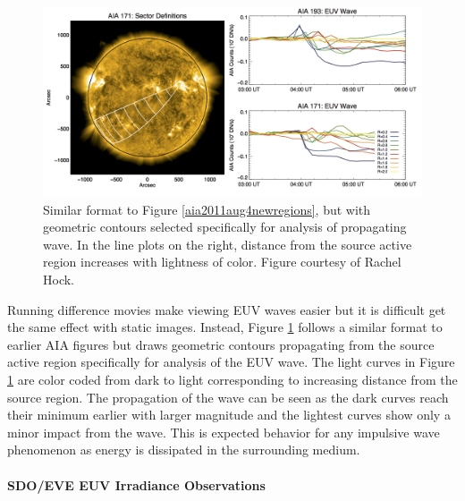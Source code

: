 \begin{figure}[!h]
    \begin{center}
	    \includegraphics[width=166mm]{Images/Aia2011Aug4Wave.png}
    \end{center}
    \caption[AIA wave analysis for 2011 August 4 event]{
        Similar format to Figure \ref{aia2011aug4newregions}, but with geometric contours selected specifically for analysis 
        of propagating wave. In the line plots on the right, distance from the source active region increases with lightness
        of color. Figure courtesy of Rachel Hock. 
	}
    \label{aia2011aug4wave}
\end{figure}

Running difference movies make viewing EUV waves easier but it is difficult get the same effect with static images. Instead, Figure \ref{aia2011aug4wave} follows a similar format to earlier AIA figures but draws geometric contours propagating from the source active region specifically for analysis of the EUV wave. The light curves in Figure \ref{aia2011aug4wave} are color coded from dark to light corresponding to increasing distance from the source region. The propagation of the wave can be seen as the dark curves reach their minimum earlier with larger magnitude and the lightest curves show only a minor impact from the wave. This is expected behavior for any impulsive wave phenomenon as energy is dissipated in the surrounding medium. 

\paragraph{SDO/EVE EUV Irradiance Observations}

